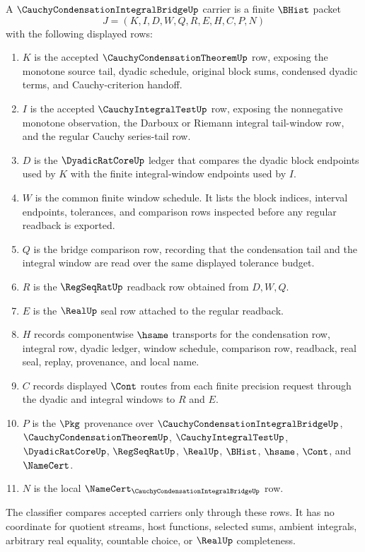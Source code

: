 \begin{definition}
\label{def:cauchy-condensation-integral-bridge-carrier}
A $\CauchyCondensationIntegralBridgeUp$ carrier is a finite $\BHist$ packet
$$
J=(K,I,D,W,Q,R,E,H,C,P,N)
$$
with the following displayed rows:
\begin{enumerate}
\item $K$ is the accepted $\CauchyCondensationTheoremUp$ row, exposing the monotone source tail, dyadic schedule, original block sums, condensed dyadic terms, and Cauchy-criterion handoff.
\item $I$ is the accepted $\CauchyIntegralTestUp$ row, exposing the nonnegative monotone observation, the Darboux or Riemann integral tail-window row, and the regular Cauchy series-tail row.
\item $D$ is the $\DyadicRatCoreUp$ ledger that compares the dyadic block endpoints used by $K$ with the finite integral-window endpoints used by $I$.
\item $W$ is the common finite window schedule. It lists the block indices, interval endpoints, tolerances, and comparison rows inspected before any regular readback is exported.
\item $Q$ is the bridge comparison row, recording that the condensation tail and the integral window are read over the same displayed tolerance budget.
\item $R$ is the $\RegSeqRatUp$ readback row obtained from $D,W,Q$.
\item $E$ is the $\RealUp$ seal row attached to the regular readback.
\item $H$ records componentwise $\hsame$ transports for the condensation row, integral row, dyadic ledger, window schedule, comparison row, readback, real seal, replay, provenance, and local name.
\item $C$ records displayed $\Cont$ routes from each finite precision request through the dyadic and integral windows to $R$ and $E$.
\item $P$ is the $\Pkg$ provenance over $\CauchyCondensationIntegralBridgeUp$, $\CauchyCondensationTheoremUp$, $\CauchyIntegralTestUp$, $\DyadicRatCoreUp$, $\RegSeqRatUp$, $\RealUp$, $\BHist$, $\hsame$, $\Cont$, and $\NameCert$.
\item $N$ is the local $\NameCert_{\CauchyCondensationIntegralBridgeUp}$ row.
\end{enumerate}
The classifier compares accepted carriers only through these rows. It has no coordinate for quotient streams, host functions, selected sums, ambient integrals, arbitrary real equality, countable choice, or $\RealUp$ completeness.
\end{definition}


